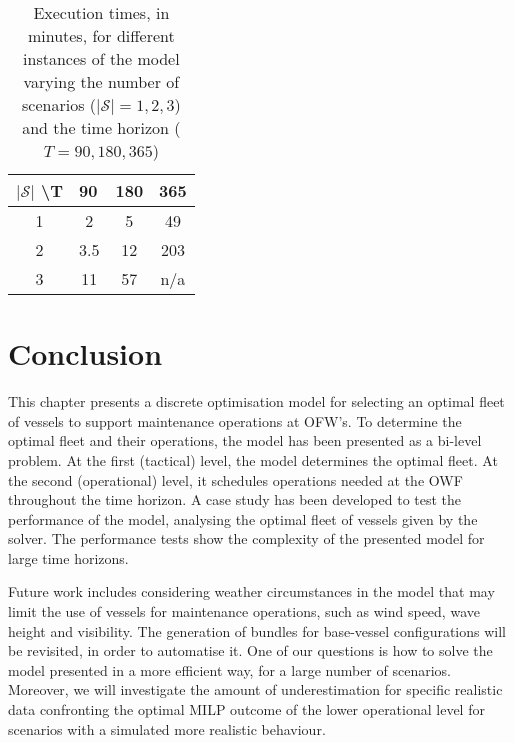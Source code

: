 \begin{table}[h!]
\centering
\caption{Execution times, in minutes, for different instances of the model varying the number of scenarios ($\left|\mathcal{S}\right|=1,2,3$) and the time horizon ($T=90,180,365$)}
\label{tab:time}
\begin{tabular}{c|ccc}
$\left|\mathcal{S}\right|$ \textbackslash T                           & \multicolumn{1}{l}{90} & \multicolumn{1}{l}{180} & \multicolumn{1}{l}{365} \\ \hline
1 & 2                       & 5                        & 49                          \\
2 & 3.5                        & 12                          & 203                          \\
3 & 11                        & 57                          & n/a                        
\end{tabular}
\end{table}

\section{Conclusion}
\label{sec:conclusionICCS}
This chapter presents a discrete optimisation model for selecting an optimal fleet of vessels to support maintenance operations at OFW's. To determine the optimal fleet and their operations, the model has been presented as a bi-level problem. At the first (tactical) level, the model determines the optimal fleet. At the second (operational) level, it schedules operations needed at the OWF throughout the time horizon. A case study has been developed to test the performance of the model, analysing the optimal fleet of vessels given by the solver. The performance tests show the complexity of the presented model for large time horizons.

Future work includes considering weather circumstances in the model that may limit the use of vessels for maintenance operations, such as wind speed, wave height and visibility. The generation of bundles for base-vessel configurations will be revisited, in order to automatise it. One of our questions is how to solve the model presented in a more efficient way, for a large number of scenarios. Moreover, we will investigate the amount of underestimation for specific realistic data confronting the optimal MILP outcome of the lower operational level for scenarios with a simulated more realistic behaviour. 


%
%


